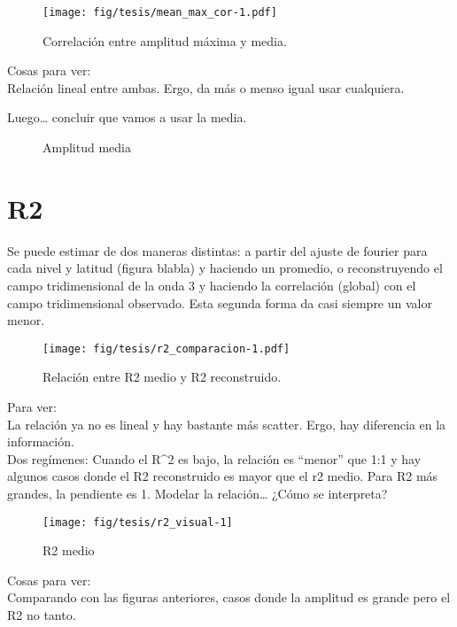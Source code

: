 \documentclass[spanish,a4paper]{book}
\begin{document}
\begin{figure}
\centering
\texttt{[image: fig/tesis/mean\_max\_cor-1.pdf]}
\caption{Correlación entre amplitud máxima y media.}
\end{figure}

Cosas para ver:\\
Relación lineal entre ambas. Ergo, da más o menso igual usar cualquiera.

Luego\ldots{} concluir que vamos a usar la media.

\begin{figure*}
\newline{}\caption{Amplitud media}\label{fig:amplitud_timeseries}
\end{figure*}

\section{R2}\label{r2}

Se puede estimar de dos maneras distintas: a partir del ajuste de
fourier para cada nivel y latitud (figura blabla) y haciendo un
promedio, o reconstruyendo el campo tridimensional de la onda 3 y
haciendo la correlación (global) con el campo tridimensional observado.
Esta segunda forma da casi siempre un valor menor.

\begin{figure}
\centering
\texttt{[image: fig/tesis/r2\_comparacion-1.pdf]}
\caption{Relación entre R2 medio y R2 reconstruido.}
\end{figure}

Para ver:\\
La relación ya no es lineal y hay bastante más scatter. Ergo, hay
diferencia en la información.\\
Dos regímenes: Cuando el R\^{}2 es bajo, la relación es ``menor'' que
1:1 y hay algunos casos donde el R2 reconstruido es mayor que el r2
medio. Para R2 más grandes, la pendiente es 1. Modelar la
relación\ldots{} ¿Cómo se interpreta?

\begin{figure*}
\texttt{[image: fig/tesis/r2\_visual-1]} \caption{R2 medio}\label{fig:r2_visual}
\end{figure*}

Cosas para ver:\\
Comparando con las figuras anteriores, casos donde la amplitud es grande
pero el R2 no tanto.
\end{document}
